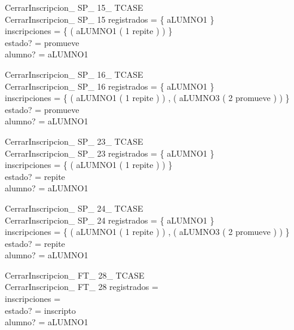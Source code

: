 \documentclass{article}
\begin{document}
\begin{schema}{CerrarInscripcion\_ SP\_ 15\_ TCASE}\\
 CerrarInscripcion\_ SP\_ 15 
\where
 registrados = \{ aLUMNO1 \} \\
 inscripciones = \{ ( aLUMNO1 \mapsto ( 1 \mapsto repite ) ) \} \\
 estado? = promueve \\
 alumno? = aLUMNO1
\end{schema}

\begin{schema}{CerrarInscripcion\_ SP\_ 16\_ TCASE}\\
 CerrarInscripcion\_ SP\_ 16 
\where
 registrados = \{ aLUMNO1 \} \\
 inscripciones = \{ ( aLUMNO1 \mapsto ( 1 \mapsto repite ) ) , ( aLUMNO3 \mapsto ( 2 \mapsto promueve ) ) \} \\
 estado? = promueve \\
 alumno? = aLUMNO1
\end{schema}

\begin{schema}{CerrarInscripcion\_ SP\_ 23\_ TCASE}\\
 CerrarInscripcion\_ SP\_ 23 
\where
 registrados = \{ aLUMNO1 \} \\
 inscripciones = \{ ( aLUMNO1 \mapsto ( 1 \mapsto repite ) ) \} \\
 estado? = repite \\
 alumno? = aLUMNO1
\end{schema}

\begin{schema}{CerrarInscripcion\_ SP\_ 24\_ TCASE}\\
 CerrarInscripcion\_ SP\_ 24 
\where
 registrados = \{ aLUMNO1 \} \\
 inscripciones = \{ ( aLUMNO1 \mapsto ( 1 \mapsto repite ) ) , ( aLUMNO3 \mapsto ( 2 \mapsto promueve ) ) \} \\
 estado? = repite \\
 alumno? = aLUMNO1
\end{schema}

\begin{schema}{CerrarInscripcion\_ FT\_ 28\_ TCASE}\\
 CerrarInscripcion\_ FT\_ 28 
\where
 registrados =~\emptyset \\
 inscripciones =~\emptyset \\
 estado? = inscripto \\
 alumno? = aLUMNO1
\end{schema}
\end{document}
